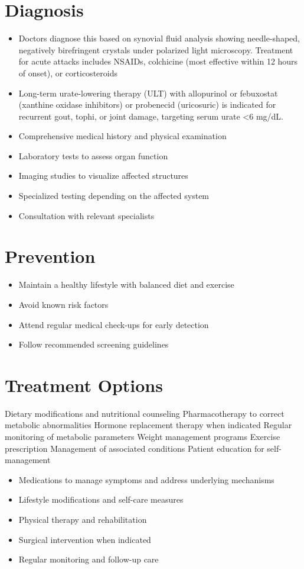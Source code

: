 \section{Diagnosis}
\begin{itemize}[noitemsep]
  \item Doctors diagnose this based on synovial fluid analysis showing needle-shaped, negatively birefringent crystals under polarized light microscopy. Treatment for acute attacks includes NSAIDs, colchicine (most effective within 12 hours of onset), or corticosteroids
  \item Long-term urate-lowering therapy (ULT) with allopurinol or febuxostat (xanthine oxidase inhibitors) or probenecid (uricosuric) is indicated for recurrent gout, tophi, or joint damage, targeting serum urate <6 mg/dL.
  \item Comprehensive medical history and physical examination
  \item Laboratory tests to assess organ function
  \item Imaging studies to visualize affected structures
  \item Specialized testing depending on the affected system
  \item Consultation with relevant specialists
\end{itemize}
\section{Prevention}
\begin{itemize}[noitemsep]
  \item Maintain a healthy lifestyle with balanced diet and exercise
  \item Avoid known risk factors
  \item Attend regular medical check-ups for early detection
  \item Follow recommended screening guidelines
\end{itemize}
\section{Treatment Options}
Dietary modifications and nutritional counseling Pharmacotherapy to correct metabolic abnormalities Hormone replacement therapy when indicated Regular monitoring of metabolic parameters Weight management programs Exercise prescription Management of associated conditions Patient education for self-management

\begin{itemize}[noitemsep]
  \item Medications to manage symptoms and address underlying mechanisms
  \item Lifestyle modifications and self-care measures
  \item Physical therapy and rehabilitation
  \item Surgical intervention when indicated
  \item Regular monitoring and follow-up care
\end{itemize}
